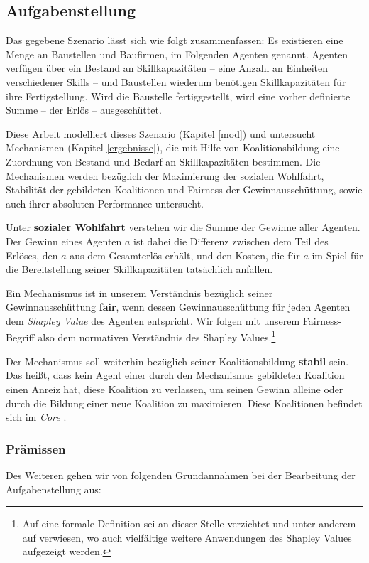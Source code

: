 \subsection{Aufgabenstellung}
\label{task}
Das gegebene Szenario lässt sich wie folgt zusammenfassen: Es existieren eine Menge an Baustellen und Baufirmen, im Folgenden Agenten genannt. Agenten verfügen über ein Bestand an Skillkapazitäten -- eine Anzahl an Einheiten verschiedener Skills -- und Baustellen wiederum benötigen Skillkapazitäten für ihre Fertigstellung. Wird die Baustelle fertiggestellt, wird eine vorher definierte Summe -- der Erlös -- ausgeschüttet.

Diese Arbeit modelliert dieses Szenario (Kapitel \ref{mod}) und untersucht Mechanismen (Kapitel \ref{ergebnisse}), die mit Hilfe von Koalitionsbildung eine Zuordnung von Bestand und Bedarf an Skillkapazitäten bestimmen. Die Mechanismen werden bezüglich der Maximierung der sozialen Wohlfahrt, Stabilität der gebildeten Koalitionen und Fairness der Gewinnausschüttung, sowie auch ihrer absoluten Performance untersucht.

Unter \textbf{sozialer Wohlfahrt} verstehen wir die Summe der Gewinne aller Agenten. Der Gewinn eines Agenten $a$ ist dabei die Differenz zwischen dem Teil des Erlöses, den $a$ aus dem Gesamterlös erhält, und den Kosten, die für $a$ im Spiel für die Bereitstellung seiner Skillkapazitäten tatsächlich anfallen.

Ein Mechanismus ist in unserem Verständnis bezüglich seiner Gewinnausschüttung \textbf{fair}, wenn dessen Gewinnausschüttung für jeden Agenten dem \textit{Shapley Value} des Agenten entspricht. Wir folgen mit unserem Fairness-Begriff also dem normativen Verständnis des Shapley Values.\footnote{Auf eine formale Definition sei an dieser Stelle verzichtet und unter anderem auf \cite{Moretti2008} verwiesen, wo auch vielfältige weitere Anwendungen des Shapley Values aufgezeigt werden.}

Der Mechanismus soll weiterhin bezüglich seiner Koalitionsbildung \textbf{stabil} sein. Das heißt, dass kein Agent einer durch den Mechanismus gebildeten Koalition einen Anreiz hat, diese Koalition zu verlassen, um seinen Gewinn alleine oder durch die Bildung einer neue Koalition zu maximieren. Diese Koalitionen befindet sich im \textit{Core} \cite{gillies2016solutions}.

\subsubsection*{Prämissen}
Des Weiteren gehen wir von folgenden Grundannahmen bei der Bearbeitung der Aufgabenstellung aus:

